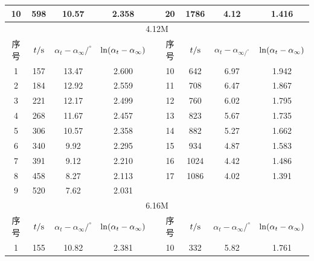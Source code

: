 \documentclass[12pt]{article}
\begin{document}
\begin{table}[!h]
\begin{tabular}{ccccccccc}
					10 & 598           & 10.57               & 2.358   &  & 20 & 1786          & 4.12                & 1.416   \\
					\midrule
					\multicolumn{9}{c}{4.12M}                                                                                              \\
					序号 & $t/{\rm s}$ & $\alpha_{t}-\alpha_{\infty}/ ^{\circ}$ & ${\rm ln}(\alpha_{t}-\alpha_{\infty})$ &  & 序号 & $t/{\rm s}$ & $\alpha_{t}-\alpha_{\infty/ ^{\circ}}$ & ${\rm ln}(\alpha_{t}-\alpha_{\infty})$ \\
					\midrule
					1  & 157           & 13.47               & 2.600   &  & 10 & 642           & 6.97                & 1.942   \\
					2  & 184           & 12.92               & 2.559   &  & 11 & 708           & 6.47                & 1.867   \\
					3  & 221           & 12.17               & 2.499   &  & 12 & 760           & 6.02                & 1.795   \\
					4  & 268           & 11.67               & 2.457   &  & 13 & 823           & 5.67                & 1.735   \\
					5  & 306           & 10.57               & 2.358   &  & 14 & 882           & 5.27                & 1.662   \\
					6  & 340           & 9.92                & 2.295   &  & 15 & 934           & 4.87                & 1.583   \\
					7  & 391           & 9.12                & 2.210   &  & 16 & 1024          & 4.42                & 1.486   \\
					8  & 458           & 8.27                & 2.113   &  & 17 & 1086          & 4.02                & 1.391   \\
					9  & 520           & 7.62                & 2.031   &  &    &               &                     &               \\
					\midrule
					\multicolumn{9}{c}{6.16M}                                                                                             \\
					\midrule
					序号 & $t/{\rm s}$ & $\alpha_{t}-\alpha_{\infty}/ ^{\circ}$ & ${\rm ln}(\alpha_{t}-\alpha_{\infty})$ &  & 序号 & $t/{\rm s}$ & $\alpha_{t}-\alpha_{\infty}/ ^{\circ}$ & ${\rm ln}(\alpha_{t}-\alpha_{\infty})$ \\
					\midrule
					1  & 155           & 10.82               & 2.381   &  & 10 & 332           & 5.82                & 1.761   \\

\end{tabular}
\end{table}
\end{document}
